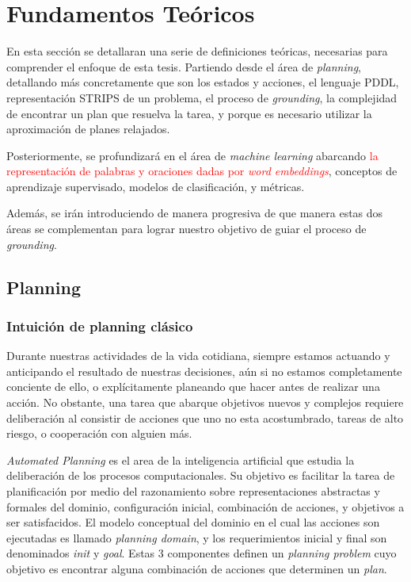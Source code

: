 \chapter{Fundamentos Teóricos}
\label{ch:lit_rev}

En esta sección se detallaran una serie de definiciones teóricas, necesarias
para comprender el enfoque de esta tesis. Partiendo desde el área de
\emph{planning}, detallando más concretamente que son los estados y acciones, el
lenguaje PDDL, representación STRIPS de un problema, el proceso de
\emph{grounding}, la complejidad de encontrar un plan que resuelva la tarea, y
porque es necesario utilizar la aproximación de planes relajados.

Posteriormente, se profundizará en el área de \emph{machine learning} abarcando
\textcolor{red}{la representación de palabras y oraciones dadas por \emph{word
embeddings}}, conceptos de aprendizaje supervisado, modelos de clasificación, y
métricas.

Además, se irán introduciendo de manera progresiva de que manera estas dos áreas
se complementan para lograr nuestro objetivo de guiar el proceso de
\emph{grounding}.

\section{Planning}

\subsection{Intuición de planning clásico}

Durante nuestras actividades de la vida cotidiana, siempre estamos actuando y
anticipando el resultado de nuestras decisiones, aún si no estamos completamente
conciente de ello, o explícitamente planeando que hacer antes de realizar una
acción. No obstante, una tarea que abarque objetivos nuevos y complejos requiere
deliberación al consistir de acciones que uno no esta acostumbrado, tareas de
alto riesgo, o cooperación con alguien más.
\citep{Nau-Ghallab-Malik-Traverso-2004}

\emph{Automated Planning} es el area de la inteligencia artificial que estudia
la deliberación de los procesos computacionales. Su objetivo es facilitar la
tarea de planificación por medio del razonamiento sobre representaciones
abstractas y formales del dominio, configuración inicial, combinación de
acciones, y objetivos a ser satisfacidos. El modelo conceptual del dominio en el
cual las acciones son ejecutadas es llamado \emph{planning domain}, y los
requerimientos inicial y final son denominados \emph{init} y \emph{goal}. Estas
3 componentes definen un \emph{planning problem} cuyo objetivo es encontrar
alguna combinación de acciones que determinen un \emph{plan}.

